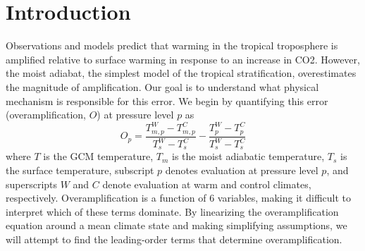 \documentclass[draft]{agujournal2019}
\begin{document}
\section{Introduction}
Observations and models predict that warming in the tropical troposphere is amplified relative to surface warming in response to an increase in CO2. However, the moist adiabat, the simplest model of the tropical stratification, overestimates the magnitude of amplification. Our goal is to understand what physical mechanism is responsible for this error. We begin by quantifying this error (overamplification, $O$) at pressure level $p$ as
\begin{equation} \label{eq:def-o}
    O_p = \frac{T_{m,p}^{W} - T_{m,p}^{C}}{T_{s}^W-T_{s}^C} - \frac{T_{p}^W-T_{p}^C}{T_{s}^W-T_{s}^C}
\end{equation}
where $T$ is the GCM temperature, $T_m$ is the moist adiabatic temperature, $T_s$ is the surface temperature, subscript $p$ denotes evaluation at pressure level $p$, and superscripts $W$ and $C$ denote evaluation at warm and control climates, respectively. Overamplification is a function of 6 variables, making it difficult to interpret which of these terms dominate. By linearizing the overamplification equation around a mean climate state and making simplifying assumptions, we will attempt to find the leading-order terms that determine overamplification.
\end{document}
